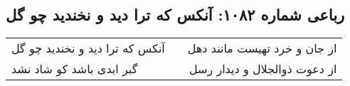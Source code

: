 \begin{center}
\section*{رباعی شماره ۱۰۸۲: آنکس که ترا دید و نخندید چو گل}
\label{sec:1082}
\begin{longtable}{l p{0.5cm} r}
آنکس که ترا دید و نخندید چو گل
&&
از جان و خرد تهیست مانند دهل
\\
گبر ابدی باشد کو شاد نشد
&&
از دعوت ذوالجلال و دیدار رسل
\\
\end{longtable}
\end{center}
